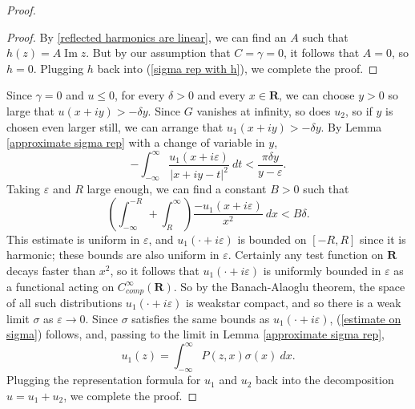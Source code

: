 \documentclass[12pt]{report}
\newcommand{\RR}{\mathbf{R}}
\renewcommand{\Im}{\operatorname{Im}}
\theoremstyle{definition}
\theoremstyle{remark}
\begin{document}
\begin{proof}
\begin{proof}
    By \ref{reflected harmonics are linear}, we can find an $A$ such that $h(z) = A \Im z$. But by our assumption that $C = \gamma = 0$, it follows that $A = 0$, so $h = 0$. Plugging $h$ back into (\ref{sigma rep with h}), we complete the proof.
\end{proof}
    Since $\gamma = 0$ and $u \leq 0$, for every $\delta > 0$ and every $x \in \RR$, we can choose $y > 0$ so large that $u(x + iy) > -\delta y$. Since $G$ vanishes at infinity, so does $u_2$, so if $y$ is chosen even larger still, we can arrange that $u_1(x + iy) > -\delta y$. By Lemma \ref{approximate sigma rep} with a change of variable in $y$,
$$-\int_{-\infty}^\infty \frac{u_1(x + i\varepsilon)}{|x + iy - t|^2} ~dt < \frac{\pi \delta y}{y - \varepsilon}.$$
    Taking $\varepsilon$ and $R$ large enough, we can find a constant $B > 0$ such that
$$\left(\int_{-\infty}^{-R} + \int_R^\infty\right) \frac{-u_1(x + i\varepsilon)}{x^2} ~dx < B \delta.$$
    This estimate is uniform in $\varepsilon$, and $u_1(\cdot + i\varepsilon)$ is bounded on $[-R, R]$ since it is harmonic; these bounds are also uniform in $\varepsilon$. Certainly any test function on $\RR$ decays faster than $x^2$, so it follows that $u_1(\cdot + i\varepsilon)$ is uniformly bounded in $\varepsilon$ as a functional acting on $C^\infty_{comp}(\RR)$. So by the Banach-Alaoglu theorem, the space of all such distributions $u_1(\cdot + i\varepsilon)$ is weakstar compact, and so there is a weak limit $\sigma$ as $\varepsilon \to 0$. Since $\sigma$ satisfies the same bounds as $u_1(\cdot + i\varepsilon)$, (\ref{estimate on sigma}) follows, and, passing to the limit in Lemma \ref{approximate sigma rep},
$$u_1(z) = \int_{-\infty}^\infty P(z, x) \sigma(x) ~dx.$$
    Plugging the representation formula for $u_1$ and $u_2$ back into the decomposition $u = u_1 + u_2$, we complete the proof.
\end{proof}
\end{document}
